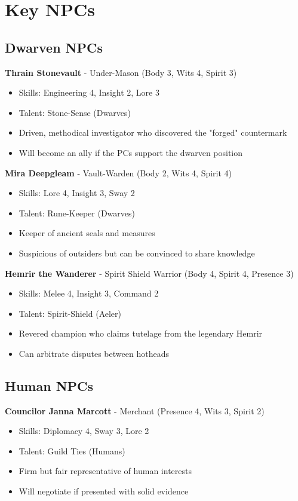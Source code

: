 \documentclass[11pt]{article}
\begin{document}
\section{Key NPCs}

\subsection{Dwarven NPCs}

\textbf{Thrain Stonevault} - Under-Mason (Body 3, Wits 4, Spirit 3)
\begin{itemize}
\item Skills: Engineering 4, Insight 2, Lore 3
\item Talent: Stone-Sense (Dwarves)
\item Driven, methodical investigator who discovered the "forged" countermark
\item Will become an ally if the PCs support the dwarven position
\end{itemize}

\textbf{Mira Deepgleam} - Vault-Warden (Body 2, Wits 4, Spirit 4)
\begin{itemize}
\item Skills: Lore 4, Insight 3, Sway 2
\item Talent: Rune-Keeper (Dwarves)
\item Keeper of ancient seals and measures
\item Suspicious of outsiders but can be convinced to share knowledge
\end{itemize}

\textbf{Hemrir the Wanderer} - Spirit Shield Warrior (Body 4, Spirit 4, Presence 3)
\begin{itemize}
\item Skills: Melee 4, Insight 3, Command 2
\item Talent: Spirit-Shield (Aeler)
\item Revered champion who claims tutelage from the legendary Hemrir
\item Can arbitrate disputes between hotheads
\end{itemize}

\subsection{Human NPCs}

\textbf{Councilor Janna Marcott} - Merchant (Presence 4, Wits 3, Spirit 2)
\begin{itemize}
\item Skills: Diplomacy 4, Sway 3, Lore 2
\item Talent: Guild Ties (Humans)
\item Firm but fair representative of human interests
\item Will negotiate if presented with solid evidence
\end{itemize}
\end{document}
